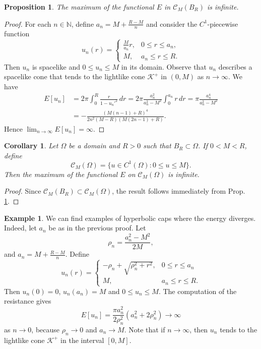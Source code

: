 \documentclass[a4paper,12pt]{amsart}
\newtheorem{corollary}[theorem]{Corollary}
\newtheorem{proposition}[theorem]{Proposition}
\theoremstyle{definition}
\newtheorem{example}[theorem]{Example}
\begin{document}
\begin{proposition} \label{pr14}
The maximum of the functional $E$ in $\mathcal{C}_M(B_R)$ is infinite.
\end{proposition}
\begin{proof}
For each $n\in\mathbb{N}$, define $a_n=M+\frac{R-M}{n}$ and consider the $C^1$-piecewise  function 
$$u_n(r)=\left\{\begin{array}{ll}
\frac{M}{a_n}r,& 0\leq r\leq a_n,\\
M,& a_n\leq r\leq R.
\end{array}
\right.$$
Then $u_n$ is spacelike and $0\leq u_n\leq M$ in its domain. Observe that $u_n$ describes a spacelike cone that tends  to the lightlike cone $\mathcal{K}^+$ in $(0,M)$  as $n\to\infty$. We have  
\begin{equation*}
\begin{split}E[u_n]&=2\pi\int_0^R\frac{r}{1-u_n'^2}\, dr=2\pi\frac{a_n^2}{a_n^2-M^2}\int_0^{a_n}r\, dr=\pi\frac{a_n^4}{a_n^2-M^2}\\
&=-\frac{(M (n-1)+R)^4}{2 n^2 (M-R) (M (2 n-1)+R)}.
\end{split}
\end{equation*}
Hence $\lim_{n\to\infty}E[u_n]=\infty$. 
\end{proof}

\begin{corollary} Let $\Omega$ be a domain and   $R>0$   such that   $B_R\subset\Omega$. If $0<M<R$, define 
$$\mathcal{C}_M(\Omega)=\{u\in C^1(\Omega)\colon   0\leq u\leq M\}.$$
Then the maximum of the functional $E$ on $\mathcal{C}_M(\Omega)$ is infinite.
\end{corollary}

\begin{proof}
Since $\mathcal{C}_M(B_R)\subset \mathcal{C}_M(\Omega)$, the result follows immediately from Prop. \ref{pr14}.
\end{proof}


\begin{example} We can find   examples of  hyperbolic caps where the energy diverges. Indeed, let $a_n$ be as in the previous proof. Let 
$$\rho_n=\frac{a_n^2-M^2}{2M},$$
and $a_n=M+\frac{R-M}{n}$. Define 
 $$u_{n}(r)=\left\{\begin{array}{ll} -\rho_n+\sqrt{\rho_n^2+r^2},& 0\leq r\leq a_n\\
M,& a_n\leq r\leq  R.
\end{array}\right.$$
Then $u_n(0)=0$, $u_n(a_n)=M$ and $0\leq u_n\leq M$.  The computation of the resistance gives 
$$E[u_n]=\frac{\pi a_n^2}{2\rho_n^2}(a_n^2+2\rho_n^2)\to \infty$$
as $n\to 0$, because $\rho_n\to 0$ and $a_n\to M$.
Note that if $n\to\infty$, then $u_n$ tends to the lightlike cone $\mathcal{K}^+$ in the interval $[0,M]$.
\end{example}
\end{document}
